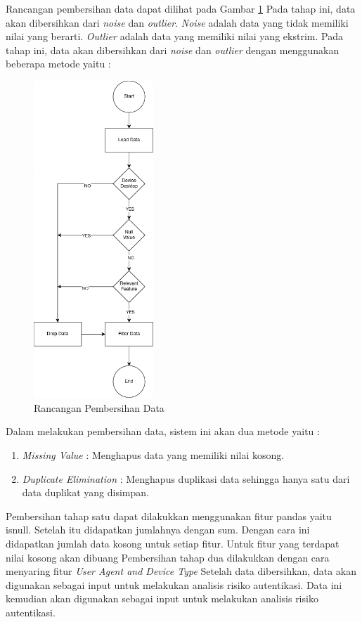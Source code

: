 Rancangan pembersihan data dapat dilihat pada Gambar \ref{fig:pembersihan-data} Pada tahap ini, data akan dibersihkan dari \textit{noise} dan \textit{outlier}. \textit{Noise} adalah data yang tidak memiliki nilai yang berarti. \textit{Outlier} adalah data yang memiliki nilai yang ekstrim. Pada tahap ini, data akan dibersihkan dari \textit{noise} dan \textit{outlier} dengan menggunakan beberapa metode yaitu :

\begin{figure}[H]
    \centering
    \includegraphics[width=0.4\textwidth]{BAB_TESIS/IMAGES/pre_processing.drawio.png}
    \caption{Rancangan Pembersihan Data}
    \label{fig:pembersihan-data}
\end{figure}

Dalam melakukan pembersihan data, sistem ini akan dua metode yaitu :

\begin{enumerate}
    \item \textit{Missing Value} : Menghapus data yang memiliki nilai kosong.
    \item \textit{Duplicate Elimination} : Menghapus duplikasi data sehingga hanya satu dari data duplikat yang disimpan. 
\end{enumerate}

Pembersihan tahap satu dapat dilakukkan menggunakan fitur pandas yaitu isnull. Setelah itu didapatkan jumlahnya dengan sum. Dengan cara ini didapatkan jumlah data kosong untuk setiap fitur. Untuk fitur yang terdapat nilai kosong akan dibuang
Pembersihan tahap dua dilakukkan dengan cara menyaring fitur \textit{User Agent and Device Type} 
Setelah data dibersihkan, data akan digunakan sebagai input untuk melakukan analisis risiko autentikasi. Data ini kemudian akan digunakan sebagai input untuk melakukan analisis risiko autentikasi.
